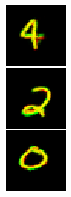\begin{figure}
\begin{subfigure}[c]{.045\linewidth}
        \caption{}
    \end{subfigure}
    \hfill
    \begin{subfigure}[c]{.045\linewidth}
        \includegraphics[width=\linewidth]{figures/SCA/mnist/recs}

\end{subfigure}
\end{figure}
